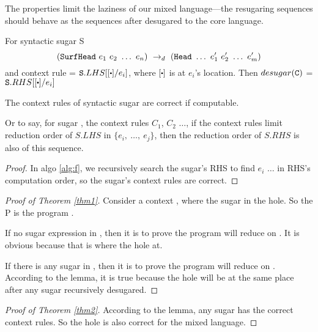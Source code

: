 The properties limit the laziness of our mixed language---the resugaring sequences should behave as the sequences after desugared to the core language.    

\begin{Def}
For syntactic sugar S
\[
(\mbox{\tt SurfHead}~e_1~e_2~\ldots~e_n) ~\rightarrow_d~ (\mbox{\tt Head}~\ldots~e_1'~e_2'~\ldots~e_m')
\]
and context rule  = $\m{S}.LHS[[\bigcdot]/e_i]$, where $[\bigcdot]$ is at $e_i$'s location. Then $desugar(\mbox{\tt C})$ = $\m{S}.RHS[[\bigcdot]/e_i]$

\end{Def}

\begin{lemma}
The context rules of syntactic sugar are correct if computable. 

Or to say, for sugar , the context rules $C_1$, $C_2$ $\ldots$, if the context rules limit reduction order of $S.LHS$ in $\{e_i,~\ldots,~e_j\}$, then the reduction order of $S.RHS$ is also of this sequence.

\end{lemma}

\begin{proof}
In algo \ref{alg:f}, we recursively search the sugar's RHS to find $e_i$ $\ldots$ in RHS's computation order, so the sugar's context rules are correct.
\end{proof}



\begin{proof}[Proof of Theorem \ref{thm1}]
Consider a context , where the sugar  in the hole. So the P is the program . 

If no sugar expression in , then it is to prove the program  will reduce on . It is obvious because that is where the hole at.

If there is any sugar in , then it is to prove the program  will reduce on . According to the lemma, it is true because the hole will be at the same place after any sugar recursively desugared.
\end{proof}

\begin{proof}[Proof of Theorem \ref{thm2}]
According to the lemma, any sugar has the correct context rules. So the hole is also correct for the mixed language.
\end{proof}